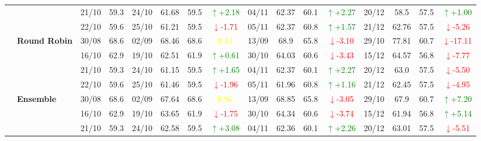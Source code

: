 \documentclass{ieeeaccess}
\begin{document}
{\begin{longtable}{llcc|cccc|cccc|cccc}
&
& 21/10 & 59.3 & 24/10 & 61.68 & 59.5 & \textcolor{green}{\(\uparrow\)+2.18} & 04/11 & 62.37 & 60.1 & \textcolor{green}{\(\uparrow\)+2.27} & 20/12 & 58.5 & 57.5 & \textcolor{green}{\(\uparrow\)+1.00} \\

&
& 22/10 & 59.6 & 25/10 & 61.21 & 59.5 & \textcolor{red}{\(\downarrow\)-1.71} & 05/11 & 62.37 & 60.8 & \textcolor{green}{\(\uparrow\)+1.57} & 21/12 & 62.76 & 57.5 & \textcolor{red}{\(\downarrow\)-5.26} \\
\cmidrule(lr){2-16}


& \textbf{Round Robin}
& 30/08 & 68.6 & 02/09 & 68.46 & 68.6 & \textcolor{yellow}{0.14} & 13/09 & 68.9 & 65.8 & \textcolor{red}{\(\downarrow\)-3.10} & 29/10 & 77.81 & 60.7 & \textcolor{red}{\(\downarrow\)-17.11} \\

&
& 16/10 & 62.9 & 19/10 & 62.51 & 61.9 & \textcolor{green}{\(\uparrow\)+0.61} & 30/10 & 64.03 & 60.6 & \textcolor{red}{\(\downarrow\)-3.43} & 15/12 & 64.57 & 56.8 & \textcolor{red}{\(\downarrow\)-7.77} \\

&
& 21/10 & 59.3 & 24/10 & 61.15 & 59.5 & \textcolor{green}{\(\uparrow\)+1.65} & 04/11 & 62.37 & 60.1 & \textcolor{green}{\(\uparrow\)+2.27} & 20/12 & 63.0 & 57.5 & \textcolor{red}{\(\downarrow\)-5.50} \\

&
& 22/10 & 59.6 & 25/10 & 61.46 & 59.5 & \textcolor{red}{\(\downarrow\)-1.96} & 05/11 & 61.96 & 60.8 & \textcolor{green}{\(\uparrow\)+1.16} & 21/12 & 62.45 & 57.5 & \textcolor{red}{\(\downarrow\)-4.95} \\
\cmidrule(lr){2-16}

& \textbf{Ensemble}
& 30/08 & 68.6 & 02/09 & 67.64 & 68.6 & \textcolor{yellow}{0.96} & 13/09 & 68.85 & 65.8 & \textcolor{red}{\(\downarrow\)-3.05} & 29/10 & 67.9 & 60.7 & \textcolor{green}{\(\uparrow\)+7.20} \\

&
& 16/10 & 62.9 & 19/10 & 63.65 & 61.9 & \textcolor{red}{\(\downarrow\)-1.75} & 30/10 & 64.34 & 60.6 & \textcolor{red}{\(\downarrow\)-3.74} & 15/12 & 61.94 & 56.8 & \textcolor{green}{\(\uparrow\)+5.14} \\

&
& 21/10 & 59.3 & 24/10 & 62.58 & 59.5 & \textcolor{green}{\(\uparrow\)+3.08} & 04/11 & 62.36 & 60.1 & \textcolor{green}{\(\uparrow\)+2.26} & 20/12 & 63.01 & 57.5 & \textcolor{red}{\(\downarrow\)-5.51} \\


\end{longtable}}
\end{document}
